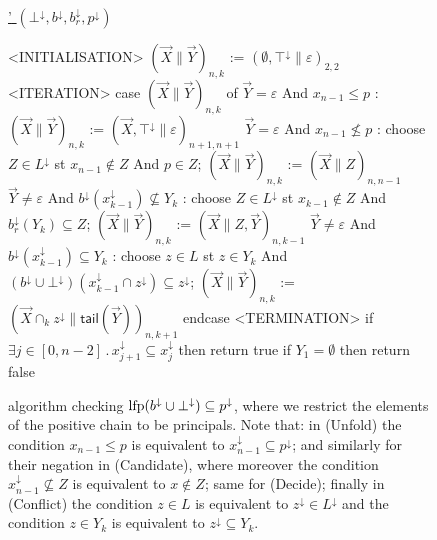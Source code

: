 \begin{figure}[t]
	\centering
	\underline{{\APDR'} $(\bot^\downarrow, b^\downarrow,b_r^{\downarrow}, p^{\downarrow})$}
	\begin{center}
		\small
		\begin{codeNT}
<INITIALISATION>
  $( \vec{X} \| \vec{Y} )_{n,k}$ := $(\emptyset,\top^\downarrow\|\varepsilon)_{2,2}$
<ITERATION>
  case $( \vec{X} \| \vec{Y} )_{n,k}$ of							%
	   $\vec{Y}=\varepsilon$ And $x_{n-1} \leq p$     :                    %
			$( \vec{X} \| \vec{Y} )_{n,k}$ := $( \vec{X}, \top^\downarrow \| \varepsilon )_{n+1,n+1}$
	   $\vec{Y}=\varepsilon$ And $x_{n-1} \not \leq p$    :                     %
			choose $Z\in L^{\downarrow}$ st  $x_{n-1} \not \in Z$ And  $p\in Z$;
			$( \vec{X} \| \vec{Y} )_{n,k}$ := $( \vec{X} \| Z )_{n,n-1}$
	   $\vec{Y} \neq \varepsilon$ And $b^\downarrow(x^\downarrow_{k-1}) \not \subseteq Y_k$ :                        %
			choose $Z \in L^\downarrow$ st $x_{k-1} \not \in Z$ And $b_r^{\downarrow}(Y_k) \subseteq Z$;
			$(\vec{X} \| \vec{Y} )_{n,k}$ := $(\vec{X} \| Z , \vec{Y} )_{n,k-1}$
	   $\vec{Y} \neq \varepsilon$ And $b^\downarrow(x^\downarrow_{k-1}) \subseteq Y_k$ :                        %
			choose $z \in L$ st $z \in Y_k$ And $(b^\downarrow \cup \bot^\downarrow)(x^\downarrow_{k-1} \cap z^\downarrow) \subseteq z^\downarrow$;
			$(\vec{X} \| \vec{Y} )_{n,k}$ := $(\vec{X} \cap_k z^\downarrow \| \mathsf{tail}(\vec{Y}) )_{n,k+1}$
  endcase
<TERMINATION>
	if $\exists j\in [0,n-2]\,.\, x^\downarrow_{j+1} \subseteq x^\downarrow_j$ then return true		 %
	if $Y_1=\emptyset$ then return false							%
\end{codeNT}
	\end{center}
	\caption{{\APDR} algorithm checking $\text{lfp} (b^\downarrow \cup \bot^\downarrow) \subseteq p^\downarrow$, where we restrict the elements of the positive chain to be principals. Note that: in (Unfold) the condition $x_{n-1} \leq p$ is equivalent to $x^\downarrow_{n-1} \subseteq p^{\downarrow}$; and similarly for their negation in (Candidate), where moreover the condition $x^\downarrow_{n-1} \not \subseteq Z$ is equivalent to $x\not\in Z$; same for (Decide); finally in (Conflict) the condition $z \in L$ is equivalent to $z^\downarrow \in L^\downarrow$ and the condition $z \in Y_k$ is equivalent to $z^\downarrow \subseteq Y_k$.}
	\label{fig:app:APDRonDownset2}
\end{figure}

